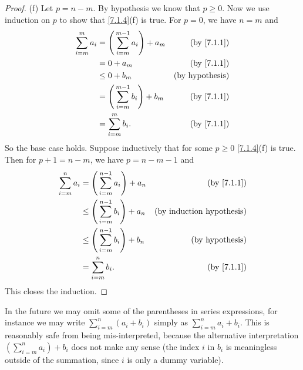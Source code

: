 \begin{proof}{(f)}
  Let \(p = n - m\).
  By hypothesis we know that \(p \geq 0\).
  Now we use induction on \(p\) to show that \cref{7.1.4}(f) is true.
  For \(p = 0\), we have \(n = m\) and
  \begin{align*}
    \sum_{i = m}^m a_i & = \Bigg(\sum_{i = m}^{m - 1} a_i\Bigg) + a_m & \text{(by \cref{7.1.1})} \\
                       & = 0 + a_m                                    & \text{(by \cref{7.1.1})} \\
                       & \leq 0 + b_m                                 & \text{(by hypothesis)}   \\
                       & = \Bigg(\sum_{i = m}^{m - 1} b_i\Bigg) + b_m & \text{(by \cref{7.1.1})} \\
                       & = \sum_{i = m}^m b_i.                        & \text{(by \cref{7.1.1})} \\
  \end{align*}
  So the base case holds.
  Suppose inductively that for some \(p \geq 0\) \cref{7.1.4}(f) is true.
  Then for \(p + 1 = n - m\), we have \(p = n - m - 1\) and
  \begin{align*}
    \sum_{i = m}^n a_i & = \Bigg(\sum_{i = m}^{n - 1} a_i\Bigg) + a_n    & \text{(by \cref{7.1.1})}         \\
                       & \leq \Bigg(\sum_{i = m}^{n - 1} b_i\Bigg) + a_n & \text{(by induction hypothesis)} \\
                       & \leq \Bigg(\sum_{i = m}^{n - 1} b_i\Bigg) + b_n & \text{(by hypothesis)}           \\
                       & = \sum_{i = m}^n b_i.                           & \text{(by \cref{7.1.1})}         \\
  \end{align*}
  This closes the induction.
\end{proof}

\begin{rmk}\label{7.1.5}
  In the future we may omit some of the parentheses in series expressions, for instance we may write \(\sum_{i = m}^n (a_i + b_i)\) simply as \(\sum_{i = m}^n a_i + b_i\).
  This is reasonably safe from being mis-interpreted, because the alternative interpretation \((\sum_{i = m}^n a_i) + b_i\) does not make any sense
  (the index \(i\) in \(b_i\) is meaningless outside of the summation, since \(i\) is only a dummy variable).
\end{rmk}


